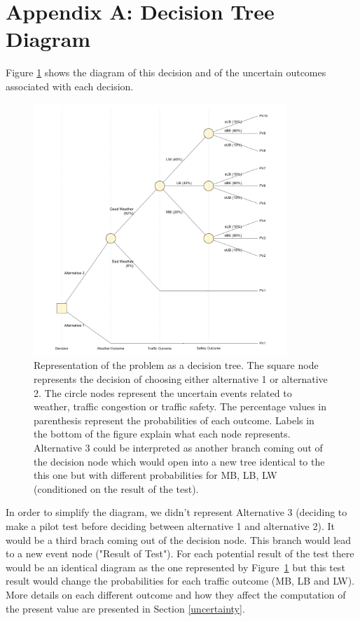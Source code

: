 \documentclass[11pt, letterpaper]{article}
\begin{document}
\begin{multicols}{2}
\printbibliography
\end{multicols}

\pagebreak
\section*{Appendix A: Decision Tree Diagram}

Figure \ref{decisiontree} shows the diagram of this decision and of the
uncertain outcomes associated with each decision.

\begin{figure}[H]
\centering
\includegraphics[width=0.85\textwidth]{../../R/decisiontree.png}
\caption{Representation of the problem as a decision tree. The square node represents the decision of choosing either alternative 1 or alternative 2. The circle nodes represent the uncertain events related to weather, traffic congestion or traffic safety. The percentage values in parenthesis represent the probabilities of each outcome. Labels in the bottom of the figure explain what each node represents. Alternative 3 could be interpreted as another branch coming out of the decision node which would open into a new tree identical to the this one but with different probabilities for MB, LB, LW (conditioned on the result of the test).}
\label{decisiontree}
\end{figure}

In order to simplify the diagram, we didn't represent Alternative 3 (deciding to make a pilot test before deciding between alternative 1 and alternative 2). It would be a third brach coming out of the decision node. This branch would lead to a new event node ("Result of Test"). For each potential result of the test there would be an identical diagram as the one represented by Figure~\ref{decisiontree} but this test result would change the probabilities for each traffic outcome (MB, LB and LW). More details on each different outcome and how they affect the computation of the present value are presented in Section \ref{uncertainty}.
\end{document}
